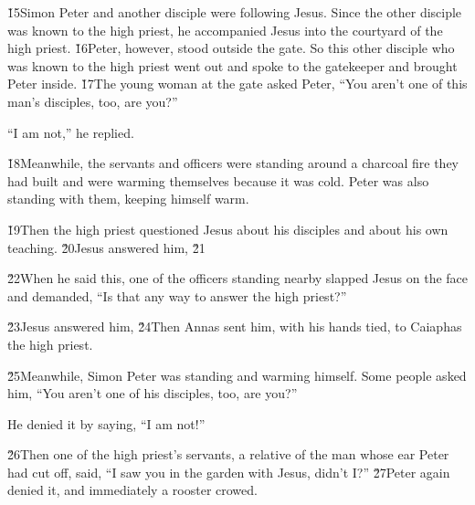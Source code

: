 \v{15}Simon Peter and another disciple were following Jesus. Since the other disciple was known to the high priest, he accompanied Jesus into the courtyard of the high priest. \v{16}Peter, however, stood outside the gate. So this other disciple who was known to the high priest went out and spoke to the gatekeeper and brought Peter inside. \v{17}The young woman at the gate asked Peter, ``You aren't one of this man's disciples, too, are you?''

``I am not,'' he replied.

\v{18}Meanwhile, the servants and officers were standing around a charcoal fire they had built and were warming themselves because it was cold. Peter was also standing with them, keeping himself warm.

\v{19}Then the high priest questioned Jesus about his disciples and about his own teaching. \v{20}Jesus answered him,  \v{21}

\v{22}When he said this, one of the officers standing nearby slapped Jesus on the face and demanded, ``Is that any way to answer the high priest?''

\v{23}Jesus answered him,  \v{24}Then Annas sent him, with his hands tied, to Caiaphas the high priest.

\v{25}Meanwhile, Simon Peter was standing and warming himself. Some people asked him, ``You aren't one of his disciples, too, are you?''

He denied it by saying, ``I am not!''

\v{26}Then one of the high priest's servants, a relative of the man whose ear Peter had cut off, said, ``I saw you in the garden with Jesus, didn't I?'' \v{27}Peter again denied it, and immediately a rooster crowed.

